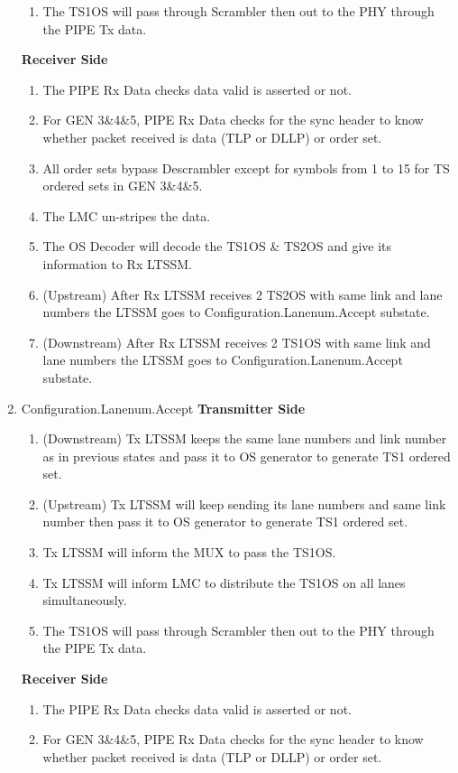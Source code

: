 \begin{enumerate}
\begin{enumerate}
  \item The TS1OS will pass through Scrambler then out to the PHY through the PIPE Tx data.
\end{enumerate}
\textbf{Receiver Side}
\begin{enumerate}
  \item The PIPE Rx Data checks data valid is asserted or not.
  \item For GEN 3\&4\&5, PIPE Rx Data checks for the sync header to know whether packet received is data (TLP or DLLP) or order set.
  \item All order sets bypass Descrambler except for symbols from 1 to 15 for TS ordered sets in GEN 3\&4\&5.
  \item The LMC un-stripes the data.
  \item The OS Decoder will decode the TS1OS \& TS2OS and give its information to Rx LTSSM.
  \item (Upstream) After Rx LTSSM receives 2 TS2OS with same link and lane numbers the LTSSM goes to Configuration.Lanenum.Accept substate.
  \item (Downstream) After Rx LTSSM receives 2 TS1OS with same link and lane numbers the LTSSM goes to Configuration.Lanenum.Accept substate.
\end{enumerate}
\item Configuration.Lanenum.Accept
\newline\textbf{Transmitter Side}
\begin{enumerate}
  \item (Downstream) Tx LTSSM keeps the same lane numbers and link number as in previous states and pass it to OS generator to generate TS1 ordered set.
  \item (Upstream) Tx LTSSM will keep sending its lane numbers and same link number then pass it to OS generator to generate TS1 ordered set.
  \item Tx LTSSM will inform the MUX to pass the TS1OS.
  \item Tx LTSSM will inform LMC to distribute the TS1OS on all lanes simultaneously.
  \item The TS1OS will pass through Scrambler then out to the PHY through the PIPE Tx data.
\end{enumerate}
\textbf{Receiver Side}
\begin{enumerate}
  \item The PIPE Rx Data checks data valid is asserted or not.
  \item For GEN 3\&4\&5, PIPE Rx Data checks for the sync header to know whether packet received is data (TLP or DLLP) or order set.

\end{enumerate}
\end{enumerate}
